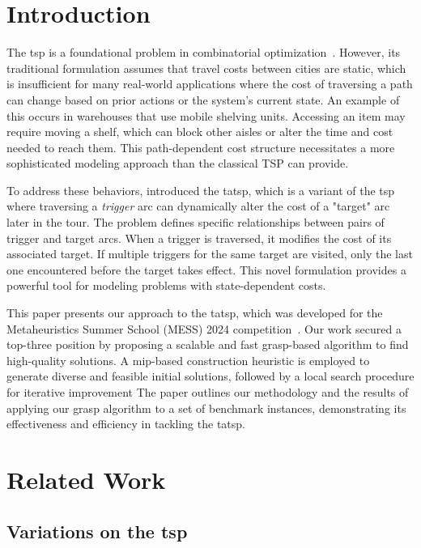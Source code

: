 \documentclass[twocolumn, switch]{article} %
\begin{document}
\section{Introduction}
The \gls{tsp} is a foundational problem in combinatorial optimization~\cite{Applegate2011}. 
However, its traditional formulation assumes that travel costs between cities are static, which is insufficient for many real-world applications where the cost of traversing a path can change based on prior actions or the system's current state.
An example of this occurs in warehouses that use mobile shelving units. Accessing an item may require moving a shelf, which can block other aisles or alter the time and cost needed to reach them. This path-dependent cost structure necessitates a more sophisticated modeling approach than the classical TSP can provide.

To address these behaviors, \citet{Cerrone} introduced the \gls{tatsp}, which is a variant of the \gls{tsp} where traversing a \textit{trigger} arc can dynamically alter the cost of a "target" arc later in the tour. 
The problem defines specific relationships between pairs of trigger and target arcs. 
When a trigger is traversed, it modifies the cost of its associated target. 
If multiple triggers for the same target are visited, only the last one encountered before the target takes effect. 
This novel formulation provides a powerful tool for modeling problems with state-dependent costs.

This paper presents our approach to the \gls{tatsp}, which was developed for the Metaheuristics Summer School (MESS) 2024 competition~\cite{mess2024}. 
Our work secured a top-three position by proposing a scalable and fast \gls{grasp}-based algorithm to find high-quality solutions. 
A \gls{mip}-based construction heuristic is employed to generate diverse and feasible initial solutions, followed by a local search procedure for iterative improvement
The paper outlines our methodology and the results of applying our \gls{grasp} algorithm to a set of benchmark instances, demonstrating its effectiveness and efficiency in tackling the \gls{tatsp}.

\section{Related Work}
\label{sec:related_work}

\subsection{Variations on the \gls{tsp}}
\end{document}
